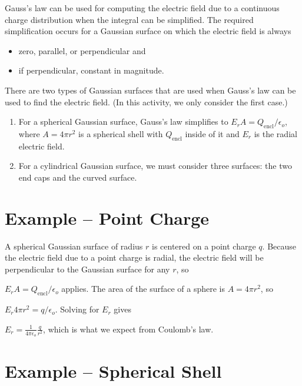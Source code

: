 \documentclass{article}
\newcommand{\ds}[0]{\displaystyle}
\begin{document}
Gauss's law can be used for computing the electric field due to a continuous charge distribution when the integral can be simplified. The required simplification occurs for a Gaussian surface on which the electric field is always

\begin{itemize}

  \item zero, parallel, or perpendicular and

  \item if perpendicular, constant in magnitude.

\end{itemize}

There are two types of Gaussian surfaces that are used when Gauss's law can be used to find the electric field. (In this activity, we only consider the first case.)

\begin{enumerate}

  \item For a spherical Gaussian surface, Gauss's law simplifies to $\ds E_rA = {Q_{\text{encl}}}/{\epsilon_o}$, where $A=4\pi r^2$ is a spherical shell with $Q_{\text{encl}}$ inside of it and $E_r$ is the radial electric field.

  \item For a cylindrical Gaussian surface, we must consider three surfaces: the two end caps and the curved surface.

\end{enumerate}


\section{Example -- Point Charge}

A spherical Gaussian surface of radius $r$ is centered on a point charge $q$. Because the electric field due to a point charge is radial, the electric field will be perpendicular to the Gaussian surface for any $r$, so

$\ds E_rA = {Q_{\text{encl}}}/{\epsilon_o}$ applies. The area of the surface of a sphere is $A = 4\pi r^2$, so

$\ds E_r 4\pi r^2 = {q}/{\epsilon_o}$. Solving for $E_r$ gives

$\ds E_r = \frac{1}{4\pi\epsilon_o}\frac{q}{r^2}$, which is what we expect from Coulomb's law.

\section{Example -- Spherical Shell}
\end{document}
